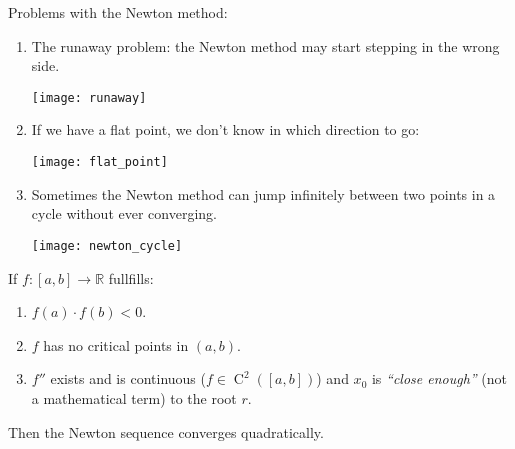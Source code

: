 Problems with the Newton method:
\begin{enumerate}
    \item {
        The runaway problem: the Newton method may start stepping in the wrong side.
        \begin{figure*}[h]
            \centering
            \texttt{[image: runaway]}
        \end{figure*}
    }
    \item {
        If we have a flat point, we don't know in which direction to go:
        \begin{figure*}[h]
            \centering
            \texttt{[image: flat\_point]}
        \end{figure*}
    }
    \item {
        Sometimes the Newton method can jump infinitely between two points in a cycle
        without ever converging.
        \begin{figure*}[h]
            \centering
            \texttt{[image: newton\_cycle]}
        \end{figure*}
    }
\end{enumerate}
\pagebreak
\begin{theorem}
    If $f : [a, b] \to \mathbb{R}$ fullfills:
    \begin{enumerate}
        \item {
            $f(a) \cdot f(b) < 0$.
        }
        \item {
            $f$ has no critical points in $(a, b)$.
        }
        \item {
            $f''$ exists and is continuous ($f \in \operatorname{C}^2([a, b])$)
            and $x_0$ is \textit{``close enough''} (not a mathematical term)
            to the root $r$.
        }
    \end{enumerate}
    Then the Newton sequence converges quadratically.
\end{theorem}

